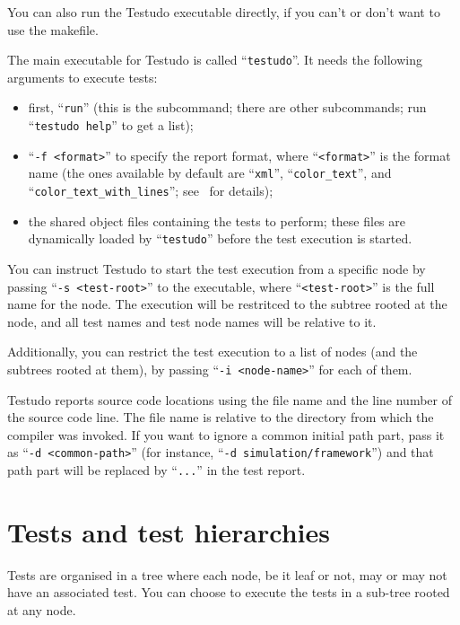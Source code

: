 \documentclass[twoside, a4paper, article]{memoir}
\begin{document}
You can also run the Testudo executable directly, if you can't or don't want to
use the makefile.

The main executable for Testudo is called ``\texttt{testudo}''.  It needs the
following arguments to execute tests:
\begin{itemize}
\item first, ``\texttt{run}'' (this is the subcommand; there are other
  subcommands; run ``\texttt{testudo help}'' to get a list);
\item ``\texttt{-f <format>}'' to specify the report format, where
  ``\texttt{<format>}'' is the format name (the ones available by default are
  ``\texttt{xml}'', ``\texttt{color\_text}'', and
  ``\texttt{color\_text\_with\_lines}''; see~ for
  details);
\item the shared object files containing the tests to perform; these files are
  dynamically loaded by ``\texttt{testudo}'' before the test execution is
  started.
\end{itemize}

You can instruct Testudo to start the test execution from a specific node by
passing ``\texttt{-s <test-root>}'' to the executable, where
``\texttt{<test-root>}'' is the full name for the node.  The execution will be
restritced to the subtree rooted at the node, and all test names and test node
names will be relative to it.

Additionally, you can restrict the test execution to a list of nodes (and the
subtrees rooted at them), by passing ``\texttt{-i <node-name>}'' for each of
them.

Testudo reports source code locations using the file name and the line number
of the source code line.  The file name is relative to the directory from which
the compiler was invoked.  If you want to ignore a common initial path part,
pass it as ``\texttt{-d <common-path>}'' (for instance, ``\texttt{-d
  simulation/framework}'') and that path part will be replaced by
``\texttt{...}''  in the test report.


\chapter{Tests and test hierarchies}
\label{cha:tests-test-hierarchies}

Tests are organised in a tree where each node, be it leaf or not, may or may
not have an associated test.  You can choose to execute the tests in a sub-tree
rooted at any node.
\end{document}
